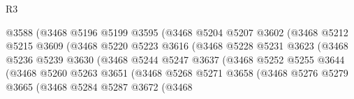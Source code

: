 \begin{lexlean}{R3}
\begin{coremodule}
                                  @3588
                                  (@3468
                                    @5196
                                    @5199
                                    @3595
                                    (@3468
                                      @5204
                                      @5207
                                      @3602
                                      (@3468
                                        @5212
                                        @5215
                                        @3609
                                        (@3468
                                          @5220
                                          @5223
                                          @3616
                                          (@3468
                                            @5228
                                            @5231
                                            @3623
                                            (@3468
                                              @5236
                                              @5239
                                              @3630
                                              (@3468
                                                @5244
                                                @5247
                                                @3637
                                                (@3468
                                                  @5252
                                                  @5255
                                                  @3644
                                                  (@3468
                                                    @5260
                                                    @5263
                                                    @3651
                                                    (@3468
                                                      @5268
                                                      @5271
                                                      @3658
                                                      (@3468
                                                        @5276
                                                        @5279
                                                        @3665
                                                        (@3468
                                                          @5284
                                                          @5287
                                                          @3672
                                                          (@3468

\end{coremodule}
\end{lexlean}
